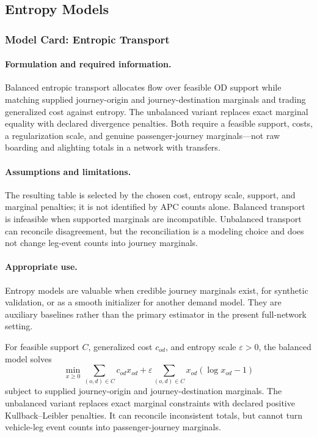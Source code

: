 
\subsection{Entropy Models}

\subsubsection{Model Card: Entropic Transport}

\paragraph{Formulation and required information.}
Balanced entropic transport allocates flow over feasible OD support while
matching supplied journey-origin and journey-destination marginals and trading
generalized cost against entropy.  The unbalanced variant replaces exact
marginal equality with declared divergence penalties.  Both require a feasible
support, costs, a regularization scale, and genuine passenger-journey
marginals---not raw boarding and alighting totals in a network with transfers.

\paragraph{Assumptions and limitations.}
The resulting table is selected by the chosen cost, entropy scale, support, and
marginal penalties; it is not identified by APC counts alone.  Balanced
transport is infeasible when supported marginals are incompatible.  Unbalanced
transport can reconcile disagreement, but the reconciliation is a modeling
choice and does not change leg-event counts into journey marginals.

\paragraph{Appropriate use.}
Entropy models are valuable when credible journey marginals exist, for
synthetic validation, or as a smooth initializer for another demand model.
They are auxiliary baselines rather than the primary estimator in the present
full-network setting.

For feasible support $C$, generalized cost $c_{od}$, and entropy scale
$\varepsilon>0$, the balanced model solves
\[
 \min_{x\geq0}
 \sum_{(o,d)\in C}c_{od}x_{od}
 +\varepsilon\sum_{(o,d)\in C}x_{od}(\log x_{od}-1)
\]
subject to supplied journey-origin and journey-destination marginals. The
unbalanced variant replaces exact marginal constraints with declared positive
Kullback--Leibler penalties. It can reconcile inconsistent totals, but cannot
turn vehicle-leg event counts into passenger-journey marginals.
